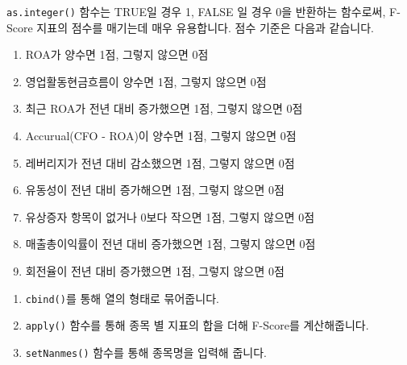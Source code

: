 \documentclass[12pt,]{book}
\newenvironment{Shaded}{\begin{snugshade}}{\end{snugshade}}
\newcommand{\DataTypeTok}[1]{\textcolor[rgb]{0.13,0.29,0.53}{#1}}
\newcommand{\DecValTok}[1]{\textcolor[rgb]{0.00,0.00,0.81}{#1}}
\newcommand{\KeywordTok}[1]{\textcolor[rgb]{0.13,0.29,0.53}{\textbf{#1}}}
\newcommand{\NormalTok}[1]{#1}
\newcommand{\OperatorTok}[1]{\textcolor[rgb]{0.81,0.36,0.00}{\textbf{#1}}}
\newcommand{\OtherTok}[1]{\textcolor[rgb]{0.56,0.35,0.01}{#1}}
\newcommand{\StringTok}[1]{\textcolor[rgb]{0.31,0.60,0.02}{#1}}
\providecommand{\tightlist}{%
  \setlength{\itemsep}{0pt}\setlength{\parskip}{0pt}}
\begin{document}
\texttt{as.integer()} 함수는 TRUE일 경우 1, FALSE 일 경우 0을 반환하는 함수로써, F-Score 지표의 점수를 매기는데 매우 유용합니다. 점수 기준은 다음과 같습니다.

\begin{enumerate}
\def\labelenumi{\arabic{enumi}.}
\tightlist
\item
  ROA가 양수면 1점, 그렇지 않으면 0점
\item
  영업활동현금흐름이 양수면 1점, 그렇지 않으면 0점
\item
  최근 ROA가 전년 대비 증가했으면 1점, 그렇지 않으면 0점
\item
  Accurual(CFO - ROA)이 양수면 1점, 그렇지 않으면 0점
\item
  레버리지가 전년 대비 감소했으면 1점, 그렇지 않으면 0점
\item
  유동성이 전년 대비 증가해으면 1점, 그렇지 않으면 0점
\item
  유상증자 항목이 없거나 0보다 작으면 1점, 그렇지 않으면 0점
\item
  매출총이익률이 전년 대비 증가했으면 1점, 그렇지 않으면 0점
\item
  회전율이 전년 대비 증가했으면 1점, 그렇지 않으면 0점
\end{enumerate}

\begin{Shaded}
\end{Shaded}

\begin{enumerate}
\def\labelenumi{\arabic{enumi}.}
\tightlist
\item
  \texttt{cbind()}를 통해 열의 형태로 묶어줍니다.
\item
  \texttt{apply()} 함수를 통해 종목 별 지표의 합을 더해 F-Score를 계산해줍니다.
\item
  \texttt{setNanmes()} 함수를 통해 종목명을 입력해 줍니다.
\end{enumerate}
\end{document}
